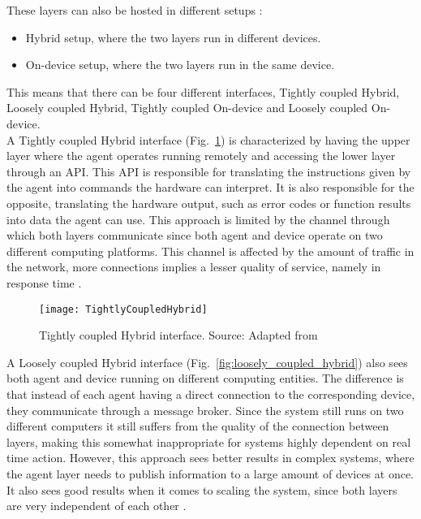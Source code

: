 These layers can also be hosted in different setups \cite{8591641}:
\begin{itemize}
	\item Hybrid setup, where the two layers run in different devices.
	\item On-device setup, where the two layers run in the same device. 
\end{itemize}

This means that there can be four different interfaces, Tightly coupled Hybrid, Loosely coupled Hybrid, Tightly coupled On-device and Loosely coupled On-device.\\

A Tightly coupled Hybrid interface (Fig.~\ref{fig:tightly_coupled_hybrid}) is characterized by having the upper layer where the agent operates running remotely and accessing the lower layer through an \gls{API}. This \gls{API} is responsible for translating the instructions given by the agent into commands the hardware can interpret. It is also responsible for the opposite, translating the hardware output, such as error codes or function results into data the agent can use. This approach is limited by the channel through which both layers communicate since both agent and device operate on two different computing platforms. This channel is affected by the amount of traffic in the network, more connections implies a lesser quality of service, namely in response time \cite{8591641}.\\

\begin{figure}[h!]
	\centering
	\texttt{[image: TightlyCoupledHybrid]}
	\caption{Tightly coupled Hybrid interface. Source: Adapted from \cite{8591641}}
	\label{fig:tightly_coupled_hybrid}
\end{figure}

A Loosely coupled Hybrid interface (Fig.~\ref{fig:loosely_coupled_hybrid}) also sees both agent and device running on different computing entities. The difference is that instead of each agent having a direct connection to the corresponding device, they communicate through a message broker. Since the system still runs on two different computers it still suffers from the quality of the connection between layers, making this somewhat inappropriate for systems highly dependent on real time action. However, this approach sees better results in complex systems, where the agent layer needs to publish information to a large amount of devices at once. It also sees good results when it comes to scaling the system, since both layers are very independent of each other \cite{8591641}.\\

